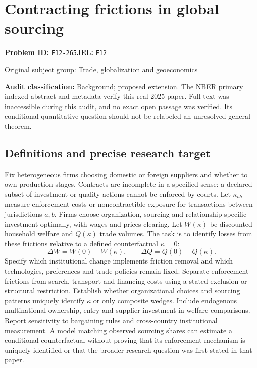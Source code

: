 \documentclass[11pt,a4paper]{article}
\begin{document}
\section*{Contracting frictions in global sourcing}
\textbf{Problem ID:} \texttt{F12-265}\quad \textbf{JEL:} \texttt{F12}\par
\label{problem:OP-0349}
{\sffamily\small\color{muted}Original subject group: Trade, globalization and geoeconomics\par}
\label{definitions:problem:30007631}
\textbf{Audit classification:} Background; proposed extension. The NBER primary indexed abstract and metadata verify this real 2025 paper. Full text was inaccessible during this audit, and no exact open passage was verified. Its conditional quantitative question should not be relabeled an unresolved general theorem.
\subsection*{Definitions and precise research target}
Fix heterogeneous firms choosing domestic or foreign suppliers and whether to own production stages. Contracts are incomplete in a specified sense: a declared subset of investment or quality actions cannot be enforced by courts. Let \(\kappa_{ab}\) measure enforcement costs or noncontractible exposure for transactions between jurisdictions \(a,b\). Firms choose organization, sourcing and relationship-specific investment optimally, with wages and prices clearing. Let \(W(\kappa)\) be discounted household welfare and \(Q(\kappa)\) trade volumes. The task is to identify losses from these frictions relative to a defined counterfactual \(\kappa=0\):
\[\Delta W=W(0)-W(\kappa),\qquad\Delta Q=Q(0)-Q(\kappa).\]
Specify which institutional change implements friction removal and which technologies, preferences and trade policies remain fixed. Separate enforcement frictions from search, transport and financing costs using a stated exclusion or structural restriction. Establish whether organizational choices and sourcing patterns uniquely identify \(\kappa\) or only composite wedges. Include endogenous multinational ownership, entry and supplier investment in welfare comparisons. Report sensitivity to bargaining rules and cross-country institutional measurement. A model matching observed sourcing shares can estimate a conditional counterfactual without proving that its enforcement mechanism is uniquely identified or that the broader research question was first stated in that paper.
\end{document}

